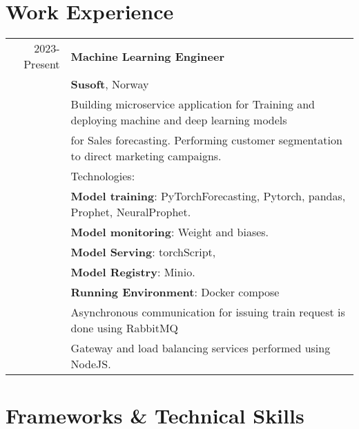 \documentclass[a4paper,10pt]{article}
\begin{document}

\section{\textbf{Work Experience}}

\begin{tabular}{r|l}
    2023-Present & \textbf{Machine Learning Engineer} \\&
    \textbf{Susoft}, Norway \\& 
    Building microservice application for Training and deploying machine and deep learning models \\&  for Sales forecasting. 
    Performing customer segmentation to direct marketing campaigns. \\&
    Technologies:\\&
     \textbf{Model training}: PyTorchForecasting, Pytorch, pandas, Prophet, NeuralProphet. \\&
     \textbf{Model monitoring}: Weight and biases.\\&
     \textbf{Model Serving}: torchScript, \\&
     \textbf{Model Registry}: Minio. \\&
     \textbf{Running Environment}: Docker compose \\&
    Asynchronous communication for issuing train request is done using RabbitMQ \\&
    Gateway and load balancing services performed using NodeJS.
\\
\end{tabular}

\section{\textbf{Frameworks \& Technical Skills}}
\end{document}
